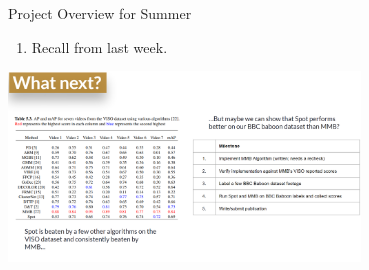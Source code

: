 


\begin{frame}{Project Overview for Summer}
    \begin{enumerate}
        \item Recall from last week.
    \end{enumerate}
    \centering
    \includegraphics[height=0.7\textheight,width=0.7\textwidth,keepaspectratio]{images/bom/oldslide.png}
\end{frame}

